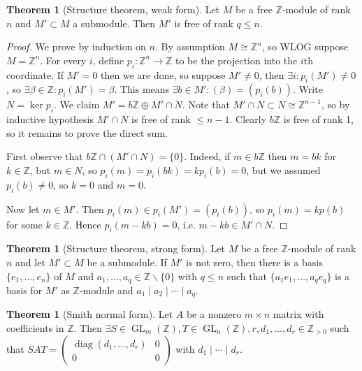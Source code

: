 \documentclass{article}
\newcommand{\Z}{\mathbb{Z}}
\newcommand{\diag}{\operatorname{diag}}
\newcommand{\GL}{\operatorname{GL}}
\theoremstyle{definition}
\newtheorem{thm}[defn]{Theorem}
\begin{document}
\begin{thm}[Structure theorem, weak form]
\label{thm:structureweak}
Let $M$ be a free $\Z$-module of rank $n$ and $M'\subset M$ a submodule. Then $M'$ is free of rank $q\leq n$.
\end{thm}
\begin{proof}
We prove by induction on $n$. By assumption $M\cong\Z^n$, so WLOG suppose $M=\Z^n$. For every $i$, define $p_i:\Z^n\rightarrow\Z$ to be the projection into the $i$th coordinate. If $M'=0$ then we are done, so suppose $M'\neq 0$, then $\exists i:p_i(M')\neq 0$, so $\exists\beta\in\Z:p_i(M')=\beta$. This means $\exists b\in M':(\beta)=(p_i(b))$. Write $N=\ker p_i$. We claim $M'=b\Z\oplus M'\cap N$. Note that $M'\cap N\subset N\cong\Z^{n-1}$, so by inductive hypothesis $M'\cap N$ is free of rank $\leq n-1$. Clearly $b\Z$ is free of rank 1, so it remains to prove the direct sum.

First observe that $b\Z\cap(M'\cap N)=\{0\}$. Indeed, if $m\in b\Z$ then $m=bk$ for $k\in\Z$, but $m\in N$, so $p_i(m)=p_i(bk)=kp_i(b)=0$, but we assumed $p_i(b)\neq 0$, so $k=0$ and $m=0$.

Now let $m\in M'$. Then $p_i(m)\in p_i(M')=(p_i(b))$, so $p_i(m)=kp(b)$ for some $k\in\Z$. Hence $p_i(m-kb)=0$, i.e. $m-kb\in M'\cap N$.
\end{proof}

\begin{thm}[Structure theorem, strong form]
\label{thm:structurestrong}
Let $M$ be a free $\Z$-module of rank $n$ and let $M'\subset M$ be a submodule. If $M'$ is not zero, then there is a basis $\{e_1,\ldots,e_n\}$ of $M$ and $a_1,\ldots,a_q\in\Z\backslash\{0\}$ with $q\leq n$ such that $\{a_1e_1,\ldots,a_qe_q\}$ is a basis for $M'$ as $\Z$-module and $a_1\mid a_2\mid\cdots\mid a_q$.
\end{thm}

\begin{thm}[Smith normal form]
Let $A$ be a nonzero $m\times n$ matrix with coefficients in $\Z$. Then $\exists S\in\GL_m(\Z),T\in\GL_n(\Z),r,d_1,\ldots,d_r\in\Z_{>0}$ such that $SAT=\begin{pmatrix}
\diag(d_1,\ldots,d_r) & 0 \\ 0 & 0
\end{pmatrix}$ with $d_1\mid\cdots\mid d_r$.
\end{thm}
\end{document}
